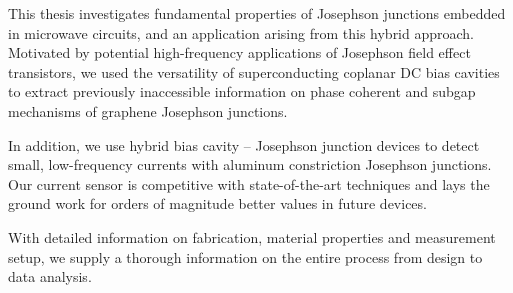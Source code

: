 \documentclass{dissertation-edit}
\begin{document}
\vspace*{1cm}

\Large

\noindent This thesis investigates fundamental properties of Josephson junctions embedded in microwave circuits, and an application arising from this hybrid approach.
%
Motivated by potential high-frequency applications of Josephson field effect transistors, we used the versatility of superconducting coplanar DC bias cavities to extract previously inaccessible information on phase coherent and subgap mechanisms of graphene Josephson junctions.

\noindent \newline
In addition, we use hybrid bias cavity -- Josephson junction devices to detect small, low-frequency currents with aluminum constriction Josephson junctions.
%
Our current sensor is competitive with state-of-the-art techniques and lays the ground work for orders of magnitude better values in future devices.

\noindent \newline
With detailed information on fabrication, material properties and measurement setup, we supply a thorough  information on the entire process from design to data analysis.
\end{document}
